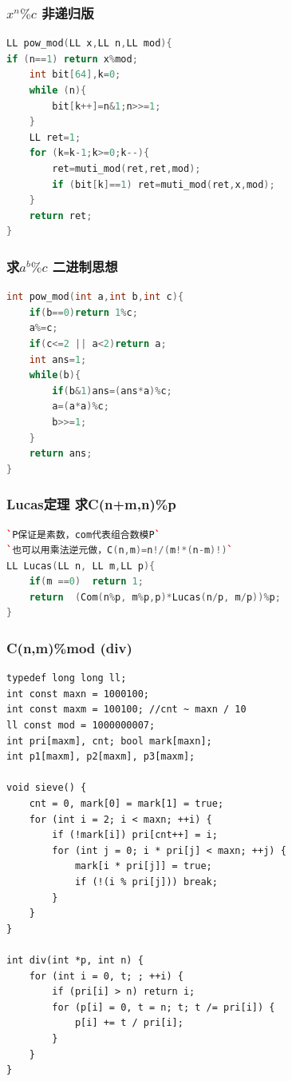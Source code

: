 \documentclass[a4paper]{article}
\begin{document}
\begin{CJK*}{UTF8}{gbsn}
\begin{multicols}{3}
\begin{flushleft}
\subsubsection{$x^{n}\%c$ 非递归版}
\begin{lstlisting}[language={c++}]
LL pow_mod(LL x,LL n,LL mod){     
if (n==1) return x%mod;
    int bit[64],k=0;
    while (n){
        bit[k++]=n&1;n>>=1;
    }
    LL ret=1;
    for (k=k-1;k>=0;k--){
        ret=muti_mod(ret,ret,mod);
        if (bit[k]==1) ret=muti_mod(ret,x,mod);
    }
    return ret;
}
\end{lstlisting}

\subsubsection{求$a^{b}\%c$ 二进制思想}
\begin{lstlisting}[language={c++}]
int pow_mod(int a,int b,int c){
	if(b==0)return 1%c;
	a%=c;
	if(c<=2 || a<2)return a;
	int ans=1;
	while(b){
		if(b&1)ans=(ans*a)%c;
		a=(a*a)%c;
		b>>=1; 
	} 
	return ans; 
} 
\end{lstlisting}

\subsubsection{Lucas定理 求C(n+m,n)\%p}
\begin{lstlisting}[language={c++}]
`P保证是素数，com代表组合数模P`
`也可以用乘法逆元做，C(n,m)=n!/(m!*(n-m)!)`
LL Lucas(LL n, LL m,LL p){
    if(m ==0)  return 1;
    return  (Com(n%p, m%p,p)*Lucas(n/p, m/p))%p;
}
\end{lstlisting}

\subsubsection{C(n,m)\%mod (div)}
\begin{lstlisting}
typedef long long ll;
int const maxn = 1000100;
int const maxm = 100100; //cnt ~ maxn / 10
ll const mod = 1000000007;
int pri[maxm], cnt; bool mark[maxn];
int p1[maxm], p2[maxm], p3[maxm];

void sieve() {
	cnt = 0, mark[0] = mark[1] = true;
	for (int i = 2; i < maxn; ++i) {
		if (!mark[i]) pri[cnt++] = i;
		for (int j = 0; i * pri[j] < maxn; ++j) {
			mark[i * pri[j]] = true;
			if (!(i % pri[j])) break;
		}
	}
}

int div(int *p, int n) {
	for (int i = 0, t; ; ++i) {
		if (pri[i] > n) return i;
		for (p[i] = 0, t = n; t; t /= pri[i]) {
			p[i] += t / pri[i];
		}
	}
}


\end{lstlisting}
\end{flushleft}
\end{multicols}
\end{CJK*}
\end{document}
